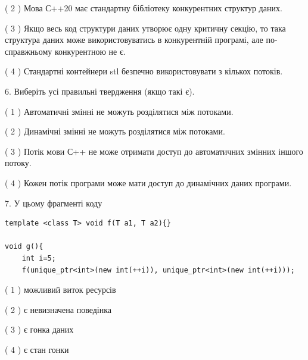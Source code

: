 \documentclass[12pt, ukrainian]{article}
\begin{document}
\begin {large}
{( 2 ) Мова С++20 має стандартну бібліотеку конкурентних структур даних.%

( 3 ) Якщо весь код структури даних утворює одну критичну секцію, то така структура даних може використовуватись в конкурентній програмі, але по-справжньо\-му конкурентною не є.%

( 4 ) Стандартні контейнери stl безпечно використовувати з кількох потоків.%
\newpage



\vspace{5mm}
6. Виберіть усі правильні твердження (якщо такі є).\par
\vspace{2mm}

( 1 ) Автоматичні змінні не можуть розділятися між потоками.%

( 2 ) Динамічні змінні не можуть розділятися між потоками.%

( 3 ) Потік мови С++ не може отримати доступ до автоматичних змінних іншого потоку.%

( 4 ) Кожен потік програми може мати доступ до динамічних даних програми.%


\vspace{5mm}
7. У цьому фрагменті коду
\begin{verbatim}
template <class T> void f(T a1, T a2){}

void g(){
    int i=5;
    f(unique_ptr<int>(new int(++i)), unique_ptr<int>(new int(++i)));
\end{verbatim}

( 1 ) можливий виток ресурсів%

( 2 ) є невизначена поведінка%

( 3 ) є гонка даних%

( 4 ) є стан гонки%
}
\end {large}
\end{document}
